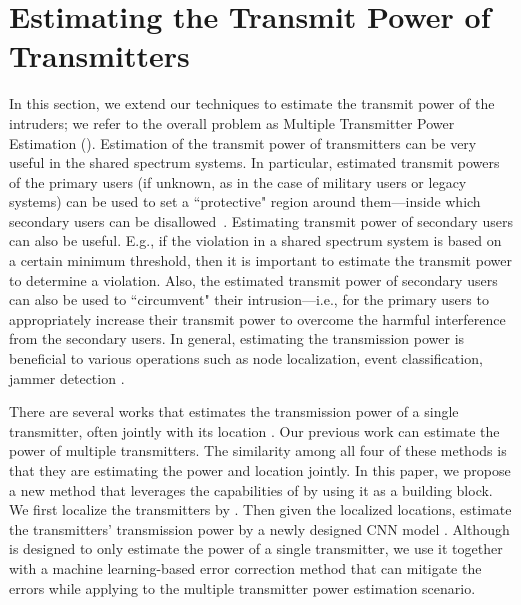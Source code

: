 \section{Estimating the Transmit Power of Transmitters}
\label{sec:power}

In this section, we extend our techniques to estimate the transmit power of the
intruders; we refer to the overall problem as  Multiple Transmitter Power Estimation (\mtpe). Estimation of the transmit power of transmitters can be very useful in the shared
spectrum systems. In particular, estimated transmit powers of the primary users (if unknown, as in the case of military users or legacy systems) can be used to set a
``protective" region around them---inside which secondary users can be disallowed~\cite{Ureten2011powerlocation}.
Estimating transmit power of secondary users can also be useful. E.g., if the violation
in a shared spectrum system is based on a certain minimum threshold, then it is important to estimate the transmit power to determine a violation. 
Also, the estimated transmit power of secondary users can also be used to ``circumvent" their intrusion---i.e., for the primary users to appropriately increase their transmit power to overcome the harmful interference from the secondary users. 
In general, estimating the transmission power is beneficial to various operations such as node localization, event classification, jammer detection \cite{PowerEstimate2010Zafer}.
 
There are several works that estimates the transmission power of a single transmitter, often jointly with its location \cite{PowerEstimate2010Zafer, Ureten2011powerlocation, icoin2007-powerposition}.
Our previous work \cite{ipsn20-mtl} can estimate the power of multiple transmitters.
The similarity among all four of these methods is that they are estimating the power and location jointly.
In this paper, we propose a new method that leverages the capabilities of \our by using it as a building block. We first localize the transmitters by \our. 
Then given the localized locations, estimate the transmitters' transmission power by a newly designed CNN model \power. 
Although \power is designed to only estimate the power of a single transmitter, we use it together with a machine learning-based error correction method that can mitigate the errors while applying \power to the multiple transmitter power estimation scenario.

